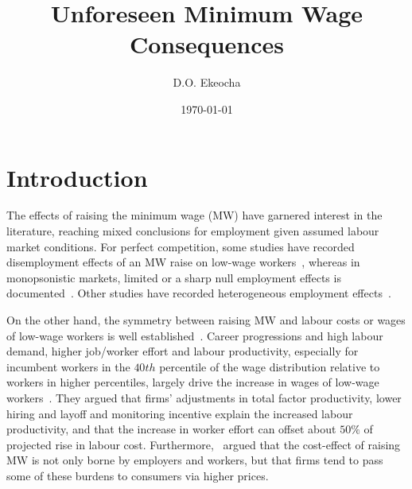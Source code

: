 \documentclass[12pt, english]{article}
\title{{Unforeseen Minimum Wage Consequences}}
\author[1]{D.O. Ekeocha}
\affil[1]{
    University of Liverpool Management School
    \\ \texttt{davidmac.ekeocha@liverpool.ac.uk}
}
\date{\today}
\begin{document}
    \maketitle


    \section{Introduction}\label{sec:introduction}
    The effects of raising the minimum wage (MW) have garnered interest in the literature, reaching mixed conclusions for employment given assumed labour market conditions. For perfect competition, some studies have recorded disemployment effects of an MW raise on low-wage workers~\parencite{stigler1946economics, hamermesh1982minimum, neumark1992employment, brown1999minimum, machin2004minimum, neumark2000minimum, borjas2010labor}, whereas in monopsonistic markets, limited or a sharp null employment effects is documented~\parencite{lester1960employment, card1993minimum, card2000minimum, aaronson2018industry, cengiz2019effect, wong2019minimum, dustmann2022reallocation}. Other studies have recorded heterogeneous employment effects~\parencite{okudaira2019minimum, medrano2023minimum, meer2023effects, gregory2022minimum}.

    On the other hand, the symmetry between raising MW and labour costs or wages of low-wage workers is well established~\parencite{medrano2023minimum,clemens2023important}. Career progressions and high labour demand, higher job/worker effort and labour productivity, especially for incumbent workers in the $40th$ percentile of the wage distribution relative to workers in higher percentiles, largely drive the increase in wages of low-wage workers~\parencite{riley2017raising, kim2019minimum, wong2019minimum, baek2021impact, zhao2021effects, seok2022macroeconomic, ku2022does, coviello2022minimum, alexandre2022minimum}. They argued that firms' adjustments in total factor productivity, lower hiring and layoff and monitoring incentive explain the increased labour productivity, and that the increase in worker effort can offset about $50\%$ of projected rise in labour cost. Furthermore,~\cite{harasztosi2019pays} argued that the cost-effect of raising MW is not only borne by employers and workers, but that firms tend to pass some of these burdens to consumers via higher prices.
\end{document}
